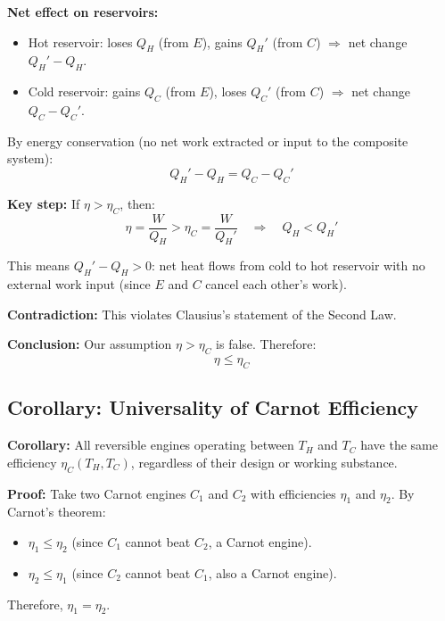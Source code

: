\documentclass[9pt,twocoloumn]{article}
\begin{document}
\textbf{Net effect on reservoirs:}
\begin{itemize}
    \item Hot reservoir: loses $Q_H$ (from $E$), gains $Q_H'$ (from $C$) $\Rightarrow$ net change $Q_H' - Q_H$.
    \item Cold reservoir: gains $Q_C$ (from $E$), loses $Q_C'$ (from $C$) $\Rightarrow$ net change $Q_C - Q_C'$.
\end{itemize}

By energy conservation (no net work extracted or input to the composite system):
\begin{equation}
Q_H' - Q_H = Q_C - Q_C'
\end{equation}

\textbf{Key step:} If $\eta > \eta_C$, then:
\begin{equation}
\eta = \frac{W}{Q_H} > \eta_C = \frac{W}{Q_H'} \quad \Rightarrow \quad Q_H < Q_H'
\end{equation}

This means $Q_H' - Q_H > 0$: net heat flows from cold to hot reservoir with no external work input (since $E$ and $C$ cancel each other's work).

\textbf{Contradiction:} This violates Clausius's statement of the Second Law.

\textbf{Conclusion:} Our assumption $\eta > \eta_C$ is false. Therefore:
\begin{equation}
\boxed{\eta \leq \eta_C}
\end{equation}

\subsection{Corollary: Universality of Carnot Efficiency}

\textbf{Corollary:} All reversible engines operating between $T_H$ and $T_C$ have the same efficiency $\eta_C(T_H, T_C)$, regardless of their design or working substance.

\textbf{Proof:} Take two Carnot engines $C_1$ and $C_2$ with efficiencies $\eta_1$ and $\eta_2$. By Carnot's theorem:
\begin{itemize}
    \item $\eta_1 \leq \eta_2$ (since $C_1$ cannot beat $C_2$, a Carnot engine).
    \item $\eta_2 \leq \eta_1$ (since $C_2$ cannot beat $C_1$, also a Carnot engine).
\end{itemize}
Therefore, $\eta_1 = \eta_2$.
\end{document}
